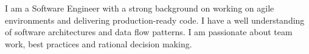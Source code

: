 

\begin{cvparagraph}

{I am a Software Engineer with a strong background on working on agile environments and
delivering production-ready code. I have a well understanding of software architectures and data
flow patterns. I am passionate about team work, best practices and rational decision making.}

\end{cvparagraph}
